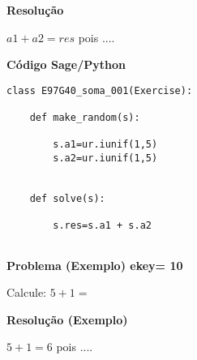 \documentclass{article}
\begin{document}
\noindent\textbf{Resolução}



$a1 + a2 = res$   pois ....




\noindent\textbf{Código Sage/Python}

\begin{verbatim}
class E97G40_soma_001(Exercise):
   
    def make_random(s):
        
        s.a1=ur.iunif(1,5)
        s.a2=ur.iunif(1,5)
                            
            
    def solve(s):
        
        s.res=s.a1 + s.a2
        

\end{verbatim}

\noindent\textbf{Problema (Exemplo) ekey= 10 }




Calcule: $5 + 1 = $    



\noindent\textbf{Resolução (Exemplo)}



$5 + 1 = 6$   pois ....
\end{document}
